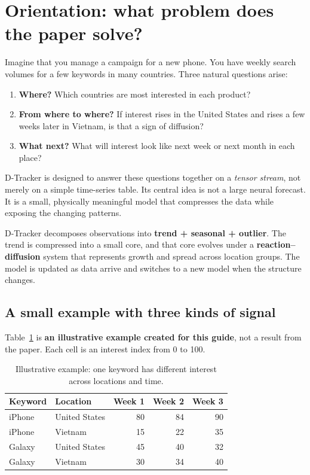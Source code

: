 \section{Orientation: what problem does the paper solve?}
\label{sec:orientation}

Imagine that you manage a campaign for a new phone. You have weekly search volumes for a few
keywords in many countries. Three natural questions arise:

\begin{enumerate}
  \item \textbf{Where?} Which countries are most interested in each product?
  \item \textbf{From where to where?} If interest rises in the United States and rises a few
        weeks later in Vietnam, is that a sign of diffusion?
  \item \textbf{What next?} What will interest look like next week or next month in each place?
\end{enumerate}

D-Tracker is designed to answer these questions together on a \emph{tensor stream}, not merely
on a simple time-series table. Its central idea is not a large neural forecast. It is a small,
physically meaningful model that compresses the data while exposing the changing patterns.

\begin{keypoint}
D-Tracker decomposes observations into \textbf{trend + seasonal + outlier}. The trend is compressed
into a small core, and that core evolves under a \textbf{reaction--diffusion} system that represents
growth and spread across location groups. The model is updated as data arrive and switches to a
new model when the structure changes.
\end{keypoint}

\subsection{A small example with three kinds of signal}

Table~\ref{tab:running-example} is \textbf{an illustrative example created for this guide}, not a
result from the paper. Each cell is an interest index from 0 to 100.

\begin{table}[htbp]
  \centering
  \small
  \caption{Illustrative example: one keyword has different interest across locations and time.}
  \label{tab:running-example}
  \begin{tabular}{llrrr}
    \toprule
    Keyword & Location & Week 1 & Week 2 & Week 3 \\
    \midrule
    iPhone & United States & 80 & 84 & 90 \\
    iPhone & Vietnam & 15 & 22 & 35 \\
    Galaxy & United States & 45 & 40 & 32 \\
    Galaxy & Vietnam & 30 & 34 & 40 \\
    \bottomrule
  \end{tabular}
\end{table}

